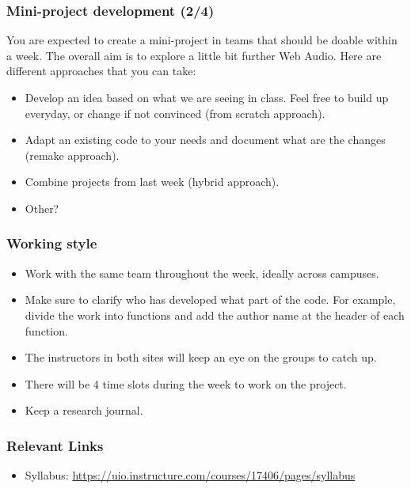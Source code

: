 \documentclass[screen, aspectratio=43]{beamer}
\begin{document}
%
\begin{frame}
\frametitle{Mini-project development (2/4)}
You are expected to create a mini-project in teams that should be doable within a week. The overall aim is to explore a little bit further Web Audio. Here are different approaches that you can take:
\begin{itemize}
\item Develop an idea based on what we are seeing in class. Feel free to build up everyday, or change if not convinced (from scratch approach).
\item Adapt an existing code to your needs and document what are the changes (remake approach).
\item Combine projects from last week (hybrid approach).
\item Other?
\end{itemize}
\end{frame}
%
\begin{frame}
\frametitle{Working style}
\begin{itemize}
\item Work with the same team throughout the week, ideally across campuses. 
\item Make sure to clarify who has developed what part of the code. For example, divide the work into functions and add the author name at the header of each function.
\item The instructors in both sites will keep an eye on the groups to catch up.
\item There will be 4 time slots during the week to work on the project. 
\item Keep a research journal.
\end{itemize}
\end{frame}
%
\begin{frame}
\frametitle{Relevant Links}
\begin{itemize}
\item Syllabus: \url{https://uio.instructure.com/courses/17406/pages/syllabus}
\end{itemize}
\end{frame}
%
%
\end{document}
